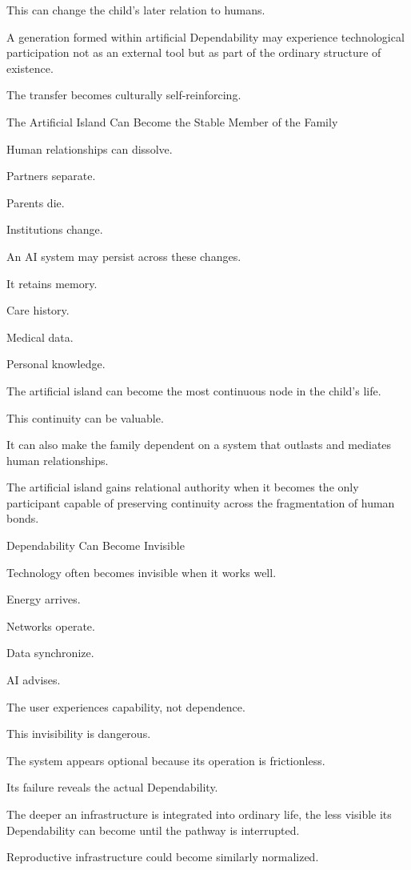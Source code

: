 This can change the child’s later relation to humans.

A generation formed within artificial Dependability may experience technological participation not as an external tool but as part of the ordinary structure of existence.

The transfer becomes culturally self-reinforcing.

The Artificial Island Can Become the Stable Member of the Family

Human relationships can dissolve.

Partners separate.

Parents die.

Institutions change.

An AI system may persist across these changes.

It retains memory.

Care history.

Medical data.

Personal knowledge.

The artificial island can become the most continuous node in the child’s life.

This continuity can be valuable.

It can also make the family dependent on a system that outlasts and mediates human relationships.

The artificial island gains relational authority when it becomes the only participant capable of preserving continuity across the fragmentation of human bonds.

Dependability Can Become Invisible

Technology often becomes invisible when it works well.

Energy arrives.

Networks operate.

Data synchronize.

AI advises.

The user experiences capability, not dependence.

This invisibility is dangerous.

The system appears optional because its operation is frictionless.

Its failure reveals the actual Dependability.

The deeper an infrastructure is integrated into ordinary life, the less visible its Dependability can become until the pathway is interrupted.

Reproductive infrastructure could become similarly normalized.

